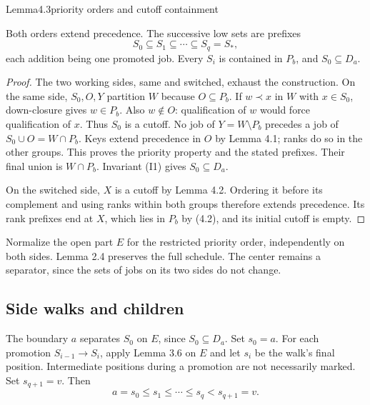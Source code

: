 \begin{numbered}{Lemma}{4.3}{priority orders and cutoff containment}

Both orders extend precedence. The successive low sets are prefixes \[
S_0\subseteq S_1\subseteq\cdots\subseteq S_q=S_*,
\] each addition being one promoted job. Every \(S_i\) is contained in \(P_b\), and \(S_0\subseteq D_a\).

\end{numbered}

\begin{proof}
The two working sides, same and switched, exhaust the construction. On the same side, \(S_0,O,Y\) partition \(W\) because \(O\subseteq P_b\). If \(w\prec x\) in \(W\) with \(x\in S_0\), down-closure gives \(w\in P_b\). Also \(w\notin O\): qualification of \(w\) would force qualification of \(x\). Thus \(S_0\) is a cutoff. No job of \(Y=W\setminus P_b\) precedes a job of \(S_0\cup O=W\cap P_b\). Keys extend precedence in \(O\) by Lemma 4.1; ranks do so in the other groups. This proves the priority property and the stated prefixes. Their final union is \(W\cap P_b\). Invariant (I1) gives \(S_0\subseteq D_a\).

On the switched side, \(X\) is a cutoff by Lemma 4.2. Ordering it before its complement and using ranks within both groups therefore extends precedence. Its rank prefixes end at \(X\), which lies in \(P_b\) by (4.2), and its initial cutoff is empty.
\end{proof}

Normalize the open part \(E\) for the restricted priority order, independently on both sides. Lemma 2.4 preserves the full schedule. The center remains a separator, since the sets of jobs on its two sides do not change.

\subsection{Side walks and children}

The boundary \(a\) separates \(S_0\) on \(E\), since \(S_0\subseteq D_a\). Set \(s_0=a\). For each promotion \(S_{i-1}\to S_i\), apply Lemma 3.6 on \(E\) and let \(s_i\) be the walk's final position. Intermediate positions during a promotion are not necessarily marked. Set \(s_{q+1}=v\). Then \[
a=s_0\leq s_1\leq\cdots\leq s_q<s_{q+1}=v.
\tag{4.4}
\]

